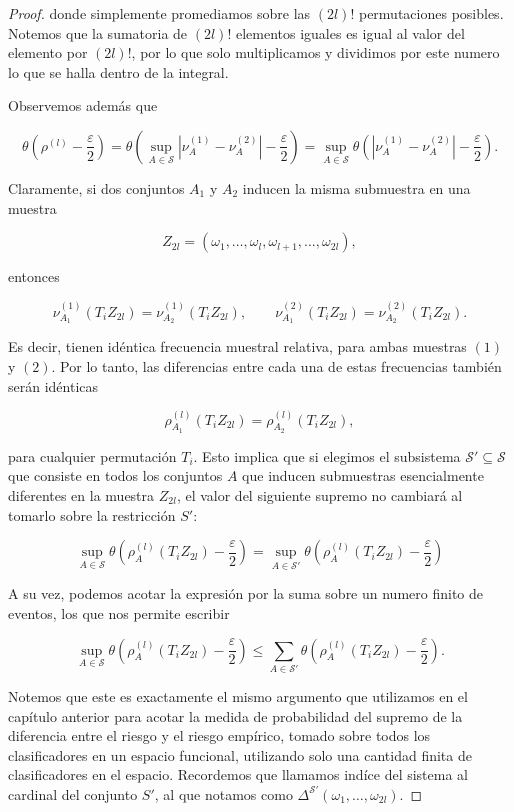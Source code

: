 \documentclass{report}
\begin{document}
\begin{proof}
donde simplemente promediamos sobre las \((2l)!\) permutaciones posibles. Notemos que la sumatoria de \((2l)!\) elementos iguales
es igual al valor del elemento por \((2l)!\), por lo que solo multiplicamos y dividimos por este numero lo que se halla dentro de la integral. \newline

Observemos además que

\[
\theta \left( \rho^{(l)} - \frac{\varepsilon}{2} \right) = \theta \left( \sup_{A \in \mathcal{S}} \left| \nu^{(1)}_A - \nu^{(2)}_A \right| -
 \frac{\varepsilon}{2} \right) = \sup_{A \in \mathcal{S}} \theta \left( \left| \nu^{(1)}_A - \nu^{(2)}_A \right| - \frac{\varepsilon}{2} \right).
\]

Claramente, si dos conjuntos \( A_1 \) y \( A_2 \) inducen la misma submuestra en una muestra 

\[
Z_{2l} = (\omega_1, \dots, \omega_l, \omega_{l+1}, \dots, \omega_{2l}),
\]

entonces

\[
\nu^{(1)}_{A_1}(T_i Z_{2l}) = \nu^{(1)}_{A_2}(T_i Z_{2l}), \qquad \nu^{(2)}_{A_1}(T_i Z_{2l}) = \nu^{(2)}_{A_2}(T_i Z_{2l}).
\]

Es decir, tienen idéntica frecuencia muestral relativa, para ambas muestras $(1)$ y $(2)$. Por lo tanto, las diferencias entre cada una de estas frecuencias también serán idénticas

\[
\rho^{(l)}_{A_1}(T_i Z_{2l}) = \rho^{(l)}_{A_2}(T_i Z_{2l}),
\]

para cualquier permutación \( T_i \). Esto implica que si elegimos el subsistema \( \mathcal{S}' \subseteq \mathcal{S} \)
 que consiste en todos los conjuntos \( A \) que inducen submuestras esencialmente diferentes en la muestra \( Z_{2l} \),
el valor del siguiente supremo no cambiará al tomarlo sobre la restricción $S'$:

\[
\sup_{A \in \mathcal{S}} \theta \left( \rho^{(l)}_A(T_i Z_{2l}) - \frac{\varepsilon}{2} \right) = 
\sup_{A \in \mathcal{S}'} \theta \left( \rho^{(l)}_A(T_i Z_{2l}) - \frac{\varepsilon}{2} \right) 
\]

A su vez, podemos acotar la expresión por la suma sobre un numero finito de eventos, los que nos permite escribir

\[
\sup_{A \in \mathcal{S}} \theta \left( \rho^{(l)}_A(T_i Z_{2l}) - \frac{\varepsilon}{2} \right)
\leq \sum_{A \in \mathcal{S}'} \theta \left( \rho^{(l)}_A(T_i Z_{2l}) - \frac{\varepsilon}{2} \right).
\]

Notemos que este es exactamente el mismo argumento que utilizamos en el capítulo anterior para acotar la medida de probabilidad del supremo de la diferencia
entre el riesgo y el riesgo empírico, tomado sobre todos los clasificadores en un espacio funcional, utilizando solo una cantidad finita de clasificadores en el espacio.
Recordemos que llamamos indíce del sistema al cardinal del conjunto $S'$, al que notamos como $ \Delta^{\mathcal{S'}}(\omega_1, \dots, \omega_{2l})$.\newline


\end{proof}
\end{document}
